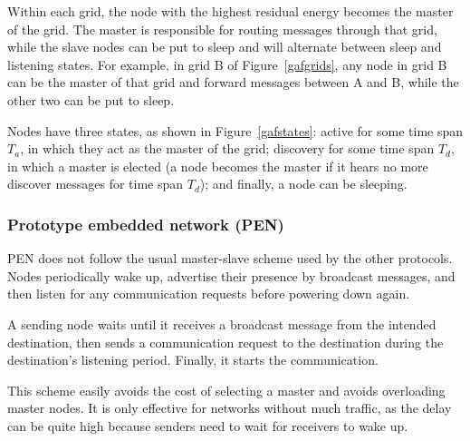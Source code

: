 Within each grid, the node with the highest residual energy becomes the master
of the grid. The master is responsible for routing messages through that grid, while the
slave nodes can be put to sleep and will alternate between sleep and listening
states. For example, in grid B of Figure~\ref{gafgrids}, any node in grid B can be the
master of that grid and forward messages between A and B, while the other two can
be put to sleep.

Nodes have three states, as shown in Figure~\ref{gafstates}: active for some time span $T_{a}$, in which they
act as the master of the grid; discovery for some time span $T_{d}$, in which a
master is elected (a node becomes the master if it hears no more discover messages
for time span $T_{d}$); and finally, a node can be sleeping.


\subsubsection{Prototype embedded network (PEN)}\label{pen}
PEN\cite{girling2000design} does not follow the usual master-slave scheme
used by the other protocols. Nodes periodically wake up, advertise their
presence
by broadcast messages, and then listen for any communication requests before
powering down again.

A sending node waits until it receives a broadcast message from the intended
destination, then sends a communication request to the destination during
the destination's listening period. Finally, it starts the communication.

This scheme easily avoids the cost of selecting a master and avoids overloading
master nodes. It is only effective for networks without much traffic, as the delay
can be quite high because senders need to wait for receivers to wake up.
